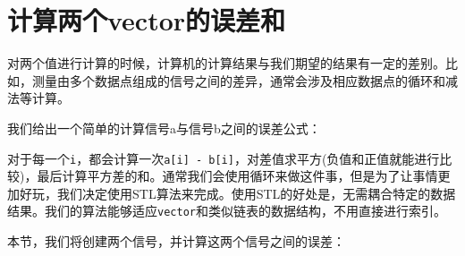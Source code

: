 \section{计算两个vector的误差和}

对两个值进行计算的时候，计算机的计算结果与我们期望的结果有一定的差别。比如，测量由多个数据点组成的信号之间的差异，通常会涉及相应数据点的循环和减法等计算。

我们给出一个简单的计算信号a与信号b之间的误差公式：


对于每一个\texttt{i}，都会计算一次\texttt{a[i] - b[i]}，对差值求平方(负值和正值就能进行比较)，最后计算平方差的和。通常我们会使用循环来做这件事，但是为了让事情更加好玩，我们决定使用STL算法来完成。使用STL的好处是，无需耦合特定的数据结果。我们的算法能够适应\texttt{vector}和类似链表的数据结构，不用直接进行索引。


本节，我们将创建两个信号，并计算这两个信号之间的误差：

